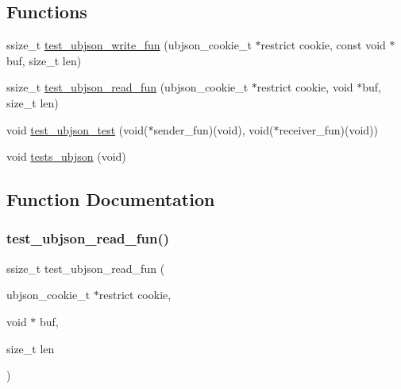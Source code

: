 \subsection*{Functions}
\begin{DoxyCompactItemize}
\item 
ssize\+\_\+t \hyperlink{tests-ubjson_8c_a57b0ab9d48deda7e0dc60098e6eafa18}{test\+\_\+ubjson\+\_\+write\+\_\+fun} (ubjson\+\_\+cookie\+\_\+t $\ast$restrict cookie, const void $\ast$buf, size\+\_\+t len)
\item 
ssize\+\_\+t \hyperlink{tests-ubjson_8c_a2158fa817423e9164e2d91fcbd1d8f84}{test\+\_\+ubjson\+\_\+read\+\_\+fun} (ubjson\+\_\+cookie\+\_\+t $\ast$restrict cookie, void $\ast$buf, size\+\_\+t len)
\item 
void \hyperlink{group__unittests_gac5fe0b001cb96b33aaf4f1b52f7d38e9}{test\+\_\+ubjson\+\_\+test} (void($\ast$sender\+\_\+fun)(void), void($\ast$receiver\+\_\+fun)(void))
\item 
void \hyperlink{tests-ubjson_8c_a33c2a66c85c974b9b38c3edff503b11b}{tests\+\_\+ubjson} (void)
\end{DoxyCompactItemize}


\subsection{Function Documentation}
\mbox{\label{tests-ubjson_8c_a2158fa817423e9164e2d91fcbd1d8f84}} 
\subsubsection{\texorpdfstring{test\+\_\+ubjson\+\_\+read\+\_\+fun()}{test\_ubjson\_read\_fun()}}
{\footnotesize\ttfamily ssize\+\_\+t test\+\_\+ubjson\+\_\+read\+\_\+fun (\begin{DoxyParamCaption}\item[{ubjson\+\_\+cookie\+\_\+t $\ast$restrict}]{cookie,  }\item[{void $\ast$}]{buf,  }\item[{size\+\_\+t}]{len }\end{DoxyParamCaption})}

\mbox{\label{tests-ubjson_8c_a57b0ab9d48deda7e0dc60098e6eafa18}} 
